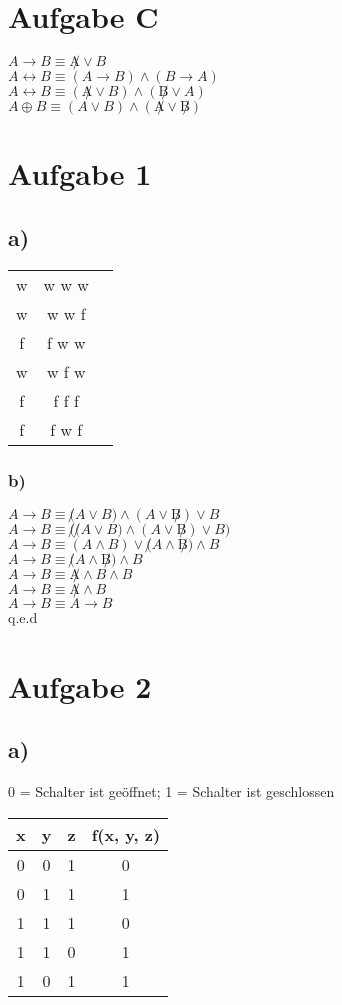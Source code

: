 \documentclass{article}
\begin{document}
	\section*{Aufgabe C}
	$A \to B \equiv \not A \lor B$ \\
	$A \leftrightarrow B \equiv (A \to B) \land (B \to A)$ \\
	$A \leftrightarrow B \equiv (\not A \lor B) \land (\not B \lor A)$ \\
	$A \oplus B \equiv (A \lor B) \land (\not A \lor \not B)$ 
	
	\section*{Aufgabe 1}
	\subsection*{a)}
	\begin{tabular}[h]{c|c|c}
	\hline
	w & w w w  \\
	w & w w f \\
	f & f w w \\
	w & w f w \\
	f & f f f \\
	f & f w f 
\end{tabular} 
	\subsubsection*{b)}	
	$A \to B \equiv \not (A \lor B) \land (A \lor \not B)  \lor B$ \\
	$A \to B \equiv \not (\not (A \lor B) \land (A \lor \not B)  \lor B)$ \\
	$A \to B \equiv (A \land B) \lor \not(A \land \not B)  \land B$ \\
	$A \to B \equiv \not(A \land \not B)  \land B$ \\
	$A \to B \equiv \not A \land B  \land B$ \\
	$A \to B \equiv \not A \land B$ \\
	$A \to B \equiv A \to B$ \\
	q.e.d
	\section*{Aufgabe 2}
	\subsection*{a)}
	0 = Schalter ist geöffnet; 1 = Schalter ist geschlossen \\
	\begin{tabular}[h]{c|c|c|c}
	x & y & z & f(x, y, z) \\
	\hline
	0 & 0 & 1 & 0 \\	
	0 & 1 & 1 & 1 \\
	1 & 1 & 1 & 0 \\	
	1 & 1 & 0 & 1 \\
	1 & 0 & 1& 1
		
	\end{tabular}
\end{document}
